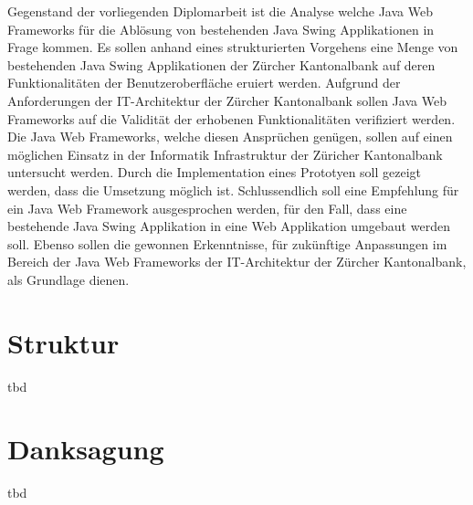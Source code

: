   Gegenstand der vorliegenden Diplomarbeit ist die Analyse welche Java Web
  Frameworks für die Ablösung von bestehenden Java Swing Applikationen in Frage
  kommen. Es sollen anhand eines strukturierten Vorgehens eine Menge von
  bestehenden Java Swing Applikationen der Zürcher Kantonalbank auf deren
  Funktionalitäten der Benutzeroberfläche eruiert werden. Aufgrund der
  Anforderungen der IT-Architektur der Zürcher Kantonalbank sollen Java Web
  Frameworks auf die Validität der erhobenen Funktionalitäten verifiziert
  werden. Die Java Web Frameworks, welche diesen Ansprüchen genügen, sollen auf
  einen möglichen Einsatz in der Informatik Infrastruktur der Züricher
  Kantonalbank untersucht werden. Durch die Implementation eines Prototyen soll
  gezeigt werden, dass die Umsetzung möglich ist. Schlussendlich soll eine
  Empfehlung für ein Java Web Framework ausgesprochen werden, für den Fall,
  dass eine bestehende Java Swing Applikation in eine Web Applikation umgebaut
  werden soll. Ebenso sollen die gewonnen Erkenntnisse, für zukünftige
  Anpassungen im Bereich der Java Web Frameworks der IT-Architektur der Zürcher
  Kantonalbank, als Grundlage dienen.
  
  \section{Struktur}
  
  tbd
  
  \section{Danksagung}
  
  tbd
  